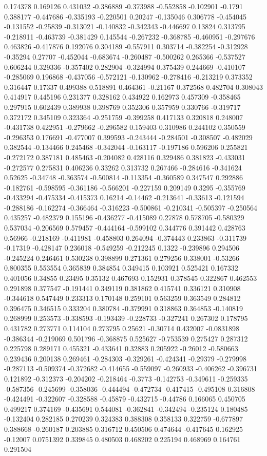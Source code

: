 0.174378 0.169126 0.431032 -0.386889 -0.373988 -0.552858 -0.102901 -0.1791 0.388177 -0.447686 -0.335193 -0.220501 0.20247 -0.135046 0.306778 -0.454045 -0.131552 -0.25839 -0.313021 -0.140832 -0.342343 -0.446697 0.13824 0.313795 -0.218911 -0.463739 -0.381429 0.145544 -0.267232 -0.368785 -0.460951 -0.297676 0.463826 -0.417876 0.192076 0.304189 -0.557911 0.303714 -0.382254 -0.312928 -0.35294 0.27707 -0.452044 -0.683674 -0.260487 -0.500262 0.265366 -0.537527 0.606244 0.329336 -0.357402 0.282904 -0.324994 0.375439 0.244669 -0.410107 -0.285069 0.196868 -0.437056 -0.572121 -0.130962 -0.278416 -0.213219 0.373352 0.316447 0.17337 0.499388 0.518891 0.464361 -0.21167 0.372568 0.482704 0.308043 0.414917 0.445196 0.231377 0.328162 0.434922 0.162973 0.457309 -0.358465 0.297915 0.602439 0.389938 0.398769 0.352306 0.357959 0.330766 -0.319717 0.372172 0.345109 0.323364 -0.251759 -0.399258 0.417133 0.320818 0.248007 -0.431738 0.422951 -0.279662 -0.296582 0.159403 0.310986 0.244102 0.350559 -0.296353 0.176691 -0.477007 0.399593 -0.243444 -0.284501 -0.308507 -0.482029 0.382544 -0.134466 0.245468 -0.342044 -0.163117 -0.197186 0.596206 0.255821 -0.272172 0.387181 0.485463 -0.204082 0.428116 0.329486 0.381823 -0.433031 -0.272577 0.275831 0.406236 0.33262 0.313732 0.267466 -0.284616 -0.341624 0.52625 -0.34748 -0.363574 -0.500814 -0.113354 -0.360589 0.347547 0.292886 -0.182761 -0.598595 -0.361186 -0.566201 -0.227159 0.209149 0.3295 -0.355769 -0.433294 -0.475334 -0.415373 0.16214 -0.14462 -0.213641 -0.33613 -0.121594 -0.288186 -0.162274 -0.366464 -0.316223 -0.500861 -0.210341 -0.505397 -0.250564 0.435257 -0.482379 0.155196 -0.436277 -0.415089 0.27878 0.578705 -0.580329 0.537034 -0.206569 0.579457 -0.444164 -0.599102 0.344776 0.391442 0.428763 0.56966 -0.218169 -0.411981 -0.458803 0.264094 -0.374443 0.233863 -0.311739 -0.17319 -0.428147 0.236018 -0.549259 -0.212245 0.1322 -0.239896 0.294506 -0.245224 0.246461 0.530238 0.398899 0.271361 0.279256 0.338001 -0.53266 0.800355 0.553554 0.365839 0.384854 0.349415 0.103921 0.525421 0.167332 0.401056 0.34855 0.23495 0.35132 0.467693 0.152931 0.378545 0.322867 0.462553 0.291898 0.377547 -0.191441 0.349119 0.381862 0.415741 0.336121 0.310908 -0.344618 0.547449 0.233313 0.170148 0.259101 0.563259 0.363549 0.284812 0.396475 0.346515 0.333204 0.380784 -0.379991 0.318863 0.364853 -0.140819 0.268999 0.253573 -0.338593 -0.193439 -0.228733 -0.327241 0.267302 0.178795 0.431782 0.273771 0.114104 0.273795 0.25621 -0.30714 0.432007 -0.0831898 -0.386344 -0.219069 0.501796 -0.368875 0.525627 -0.753539 0.275427 0.287312 0.225798 0.289171 0.455321 -0.433641 0.32883 0.205922 -0.26012 -0.580663 0.239436 0.200138 0.269461 -0.284303 -0.329261 -0.424341 -0.29379 -0.279998 -0.287113 -0.509374 -0.372682 -0.414655 -0.559097 -0.260933 -0.406262 -0.396731 0.121892 -0.312373 -0.204202 -0.218464 -0.3773 -0.142753 -0.349611 -0.259335 -0.587356 -0.245699 -0.358036 -0.444494 -0.472734 -0.417415 -0.495108 0.316808 -0.424491 -0.322607 -0.328588 -0.45879 -0.432715 -0.44786 0.166065 0.450705 0.499217 0.374169 -0.435691 0.544081 -0.362841 -0.342494 -0.235124 0.180485 -0.132404 0.282185 0.270239 0.324383 0.388308 0.358133 0.322759 -0.677897 0.388668 -0.260187 0.203885 0.316712 0.450506 0.474644 -0.417645 0.162925 -0.12007 0.0751392 0.339845 0.480503 0.468202 0.225194 0.468969 0.164761 0.291504 